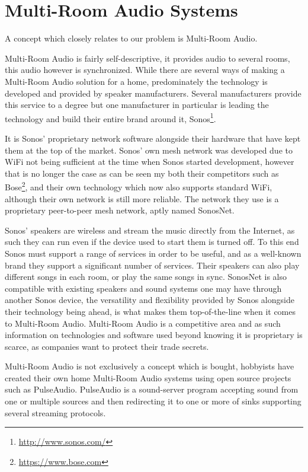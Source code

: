 \section{Multi-Room Audio Systems}
A concept which closely relates to our problem is Multi-Room Audio.

Multi-Room Audio is fairly self-descriptive, it provides audio to several rooms, this audio however is synchronized.
While there are several ways of making a Multi-Room Audio solution for a home, predominately the technology is developed and provided by speaker manufacturers.
Several manufacturers provide this service to a degree but one
manufacturer in particular is leading the technology and build their entire brand around it, Sonos\footnote{\url{http://www.sonos.com/}}.

It is Sonos' proprietary network software alongside their hardware that have kept them at the top of the market.
Sonos' own mesh network was developed due to WiFi not being sufficient
at the time when Sonos started development, however that is no longer the case as can be seen my both their competitors such as Bose\footnote{\url{https://www.bose.com}}, and their own technology which now also supports standard WiFi, although their own network is still more reliable.\cite{sonos1}
The network they use is a proprietary peer-to-peer mesh network, aptly named SonosNet.\cite{sonosWiki}

Sonos' speakers are wireless and stream the music directly from the Internet, as such they can run even if the device used to start them is turned off.
To this end Sonos must support a range of services in order to be useful, and as a well-known brand they support a significant number of services.
Their speakers can also play different songs in each room, or play the same songs in sync.
SonosNet is also compatible with existing speakers and sound systems one may have through another Sonos device, the versatility and flexibility provided by Sonos alongside their technology being ahead, is what makes them top-of-the-line when it comes to Multi-Room Audio.\cite{sonos2}
Multi-Room Audio is a competitive area and as such information on technologies and software used beyond knowing it is proprietary is scarce, as companies want to protect their trade secrets.

Multi-Room Audio is not exclusively a concept which is bought, hobbyists have created their own home Multi-Room Audio systems using open source projects such as PulseAudio.\cite{pulseAudioHobbyist}
PulseAudio is a sound-server program accepting sound from one or multiple sources and then redirecting it to one or more of sinks supporting several streaming protocols.\cite{pulseAudioModules}

